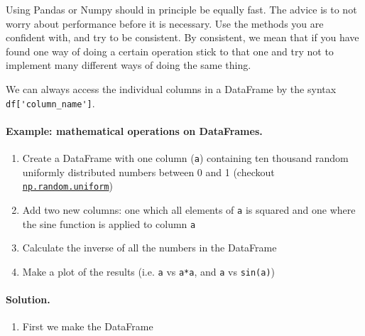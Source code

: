 \documentclass[%
oneside,                 %
final,                   %
10pt]{article}
\newenvironment{notice_mdfboxadmon}[1][]{
\begin{notice_mdfboxmdframed}[frametitle=#1]
}
{
\end{notice_mdfboxmdframed}
}
\begin{document}
\noindent

\begin{notice_mdfboxadmon}
Using Pandas or Numpy should in principle be equally fast. The advice is to not worry about performance before it is necessary. Use the methods you are confident with, and try to be consistent. By consistent, we mean that if you have found one way of doing a certain operation stick to that one and try not to implement many different ways of doing the same thing.
\end{notice_mdfboxadmon} %



We can always access the individual columns in a DataFrame by the syntax \Verb!df['column_name']!. 
\paragraph{Example: mathematical operations on DataFrames.}
\begin{enumerate}
\item Create a DataFrame with one column (\texttt{a}) containing ten thousand random uniformly distributed numbers between 0 and 1 (checkout \href{{https://numpy.org/doc/stable/reference/random/generated/numpy.random.uniform.html}}{\nolinkurl{np.random.uniform}})

\item Add two new columns: one which all elements of \texttt{a} is squared and one where the sine function is applied to column \texttt{a}

\item Calculate the inverse of all the numbers in the DataFrame

\item Make a plot of the results (i.e. \texttt{a} vs \texttt{a*a}, and \texttt{a} vs \texttt{sin(a)})
\end{enumerate}

\noindent
\paragraph{Solution.}
\begin{enumerate}
\item First we make the DataFrame
\end{enumerate}

\noindent
\end{document}
